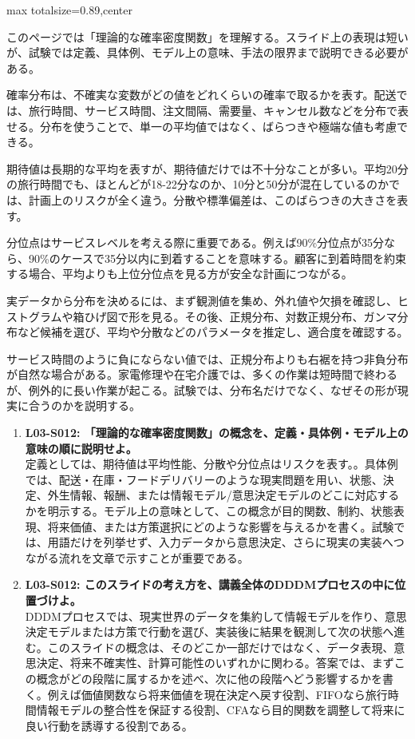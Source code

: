 \begin{minipage}[t]{0.58\textwidth}
\begin{adjustbox}{max totalsize={\textwidth}{0.89\textheight},center}
\begin{minipage}{\textwidth}\scriptsize
{}このページでは「理論的な確率密度関数」を理解する。スライド上の表現は短いが、試験では定義、具体例、モデル上の意味、手法の限界まで説明できる必要がある。\par
確率分布は、不確実な変数がどの値をどれくらいの確率で取るかを表す。配送では、旅行時間、サービス時間、注文間隔、需要量、キャンセル数などを分布で表せる。分布を使うことで、単一の平均値ではなく、ばらつきや極端な値も考慮できる。\par
期待値は長期的な平均を表すが、期待値だけでは不十分なことが多い。平均20分の旅行時間でも、ほとんどが18-22分なのか、10分と50分が混在しているのかでは、計画上のリスクが全く違う。分散や標準偏差は、このばらつきの大きさを表す。\par
分位点はサービスレベルを考える際に重要である。例えば90\%分位点が35分なら、90\%のケースで35分以内に到着することを意味する。顧客に到着時間を約束する場合、平均よりも上位分位点を見る方が安全な計画につながる。\par
実データから分布を決めるには、まず観測値を集め、外れ値や欠損を確認し、ヒストグラムや箱ひげ図で形を見る。その後、正規分布、対数正規分布、ガンマ分布など候補を選び、平均や分散などのパラメータを推定し、適合度を確認する。\par
サービス時間のように負にならない値では、正規分布よりも右裾を持つ非負分布が自然な場合がある。家電修理や在宅介護では、多くの作業は短時間で終わるが、例外的に長い作業が起こる。試験では、分布名だけでなく、なぜその形が現実に合うのかを説明する。\par{}\begin{enumerate}\item \textbf{L03-S012: 「理論的な確率密度関数」の概念を、定義・具体例・モデル上の意味の順に説明せよ。}\\定義としては、期待値は平均性能、分散や分位点はリスクを表す。。具体例では、配送・在庫・フードデリバリーのような現実問題を用い、状態、決定、外生情報、報酬、または情報モデル/意思決定モデルのどこに対応するかを明示する。モデル上の意味として、この概念が目的関数、制約、状態表現、将来価値、または方策選択にどのような影響を与えるかを書く。試験では、用語だけを列挙せず、入力データから意思決定、さらに現実の実装へつながる流れを文章で示すことが重要である。\item \textbf{L03-S012: このスライドの考え方を、講義全体のDDDMプロセスの中に位置づけよ。}\\DDDMプロセスでは、現実世界のデータを集約して情報モデルを作り、意思決定モデルまたは方策で行動を選び、実装後に結果を観測して次の状態へ進む。このスライドの概念は、そのどこか一部だけではなく、データ表現、意思決定、将来不確実性、計算可能性のいずれかに関わる。答案では、まずこの概念がどの段階に属するかを述べ、次に他の段階へどう影響するかを書く。例えば価値関数なら将来価値を現在決定へ戻す役割、FIFOなら旅行時間情報モデルの整合性を保証する役割、CFAなら目的関数を調整して将来に良い行動を誘導する役割である。\end{enumerate}

\end{minipage}
\end{adjustbox}
\end{minipage}
